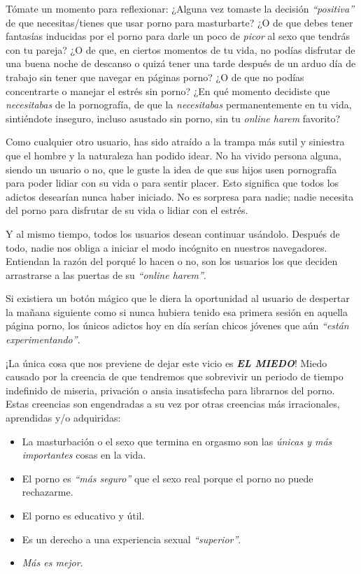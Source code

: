 \documentclass[
  spanish,
  openany]{book}
\providecommand{\tightlist}{%
  \setlength{\itemsep}{0pt}\setlength{\parskip}{0pt}}
\begin{document}
Tómate un momento para reflexionar: ¿Alguna vez tomaste la decisión \emph{``positiva''} de que necesitas/tienes que usar porno para masturbarte? ¿O de que debes tener fantasías inducidas por el porno para darle un poco de \emph{picor} al sexo que tendrás con tu pareja? ¿O de que, en ciertos momentos de tu vida, no podías disfrutar de una buena noche de descanso o quizá tener una tarde después de un arduo día de trabajo sin tener que navegar en páginas porno? ¿O de que no podías concentrarte o manejar el estrés sin porno? ¿En qué momento decidiste que \emph{necesitabas} de la pornografía, de que la \emph{necesitabas} permanentemente en tu vida, sintiéndote inseguro, incluso asustado sin porno, sin tu \emph{online harem} favorito?

Como cualquier otro usuario, has sido atraído a la trampa más sutil y siniestra que el hombre y la naturaleza han podido idear. No ha vivido persona alguna, siendo un usuario o no, que le guste la idea de que sus hijos usen pornografía para poder lidiar con su vida o para sentir placer. Esto significa que todos los adictos desearían nunca haber iniciado. No es sorpresa para nadie; nadie necesita del porno para disfrutar de su vida o lidiar con el estrés.

Y al mismo tiempo, todos los usuarios desean continuar usándolo. Después de todo, nadie nos obliga a iniciar el modo incógnito en nuestros navegadores. Entiendan la razón del porqué lo hacen o no, son los usuarios los que deciden arrastrarse a las puertas de su \emph{``online harem''}.

Si existiera un botón mágico que le diera la oportunidad al usuario de despertar la mañana siguiente como si nunca hubiera tenido esa primera sesión en aquella página porno, los únicos adictos hoy en día serían chicos jóvenes que aún \emph{``están experimentando''}.

¡La única cosa que nos previene de dejar este vicio es \emph{\textbf{EL MIEDO}}! Miedo causado por la creencia de que tendremos que sobrevivir un periodo de tiempo indefinido de miseria, privación o ansia insatisfecha para librarnos del porno. Estas creencias son engendradas a su vez por otras creencias más irracionales, aprendidas y/o adquiridas:

\begin{itemize}
\tightlist
\item
  La masturbación o el sexo que termina en orgasmo son las \emph{únicas y más importantes} cosas en la vida.
\item
  El porno es \emph{``más seguro''} que el sexo real porque el porno no puede rechazarme.
\item
  El porno es educativo y útil.
\item
  Es un derecho a una experiencia sexual \emph{``superior''}.
\item
  \emph{Más es mejor}.
\end{itemize}
\end{document}
